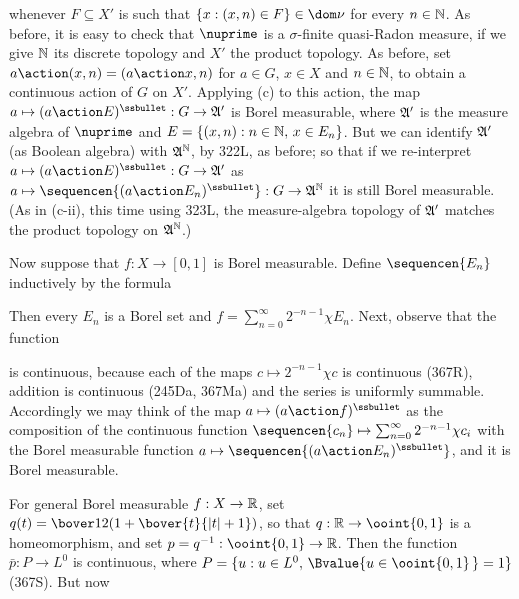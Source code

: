 {\noindent whenever $F\subseteq X'$ is such that
$\{x:(x,n)\in F\}\in\dom\nu$ for every $n\in\Bbb N$.   As before, it is
easy to check
that $\nuprime$ is a $\sigma$-finite quasi-Radon measure, if we give
$\Bbb N$ its discrete
topology and $X'$ the product topology.   As before, set
$a\action(x,n)=(a\action x,n)$ for $a\in G$, $x\in X$ and $n\in\Bbb N$,
to obtain a continuous action of $G$ on $X'$.   Applying (c) to this
action, the map $a\mapsto(a\action E)^{\ssbullet}:G\to\frak A'$ is
Borel measurable, where $\frak A'$ is the measure algebra of $\nuprime$
and $E=\{(x,n):n\in\Bbb N,\,x\in E_n\}$.   But we can identify $\frak A'$
(as Boolean algebra) with $\frak A^{\Bbb N}$, by 322L, as before;  so
that if we re-interpret $a\mapsto(a\action E)^{\ssbullet}:G\to\frak A'$
as $a\mapsto\sequencen{(a\action E_n)^{\ssbullet}}:G\to\frak A^{\Bbb N}$
it is still Borel measurable.   (As in (c-ii), this time using
323L, the measure-algebra topology of $\frak A'$ matches the product
topology on $\frak A^{\Bbb N}$.)\ \Qed

\medskip

 Now suppose that $f:X\to[0,1]$ is Borel measurable.
Define $\sequencen{E_n}$ inductively by the formula


\noindent Then every $E_n$ is a Borel set and
$f=\sum_{n=0}^{\infty}2^{-n-1}\chi E_n$.   Next, observe that the
function


\noindent is continuous, because each of the maps
$c\mapsto 2^{-n-1}\chi c$ is continuous (367R), addition is continuous
(245Da, 367Ma) and the
series is uniformly summable.   Accordingly we may think of the map
$a\mapsto (a\action f)^{\ssbullet}$ as the composition of the continuous
function
$\sequencen{c_n}\mapsto\sum_{n=0}^{\infty}2^{-n-1}\chi c_i$ with the
Borel measurable function
$a\mapsto\sequencen{(a\action E_n)^{\ssbullet}}$, and it is Borel
measurable.


 For general Borel measurable $f:X\to\Bbb R$, set
$q(t)=\bover12(1+\bover{t}{|t|+1})$, so that $q:\Bbb R\to\ooint{0,1}$ is
a homeomorphism, and set $p=q^{-1}:\ooint{0,1}\to\Bbb R$.   Then the
function $\bar p:P\to L^0$ is continuous, where
$P=\{u:u\in L^0,\,\Bvalue{u\in\ooint{0,1}\,}=1\}$ (367S).   But now

}
